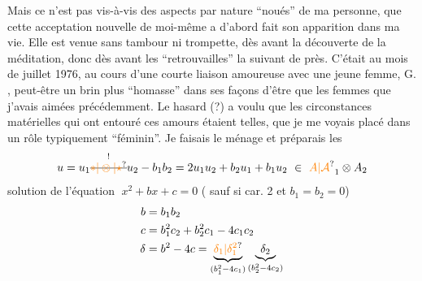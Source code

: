 Mais ce n'est pas vis-à-vis des aspects par nature ``noués'' de ma personne, que cette acceptation nouvelle de moi-même a d'abord fait son apparition dans ma vie. Elle est venue sans tambour ni trompette, dès avant la découverte de la méditation, donc dès avant les ``retrouvailles'' la suivant de près. C'était au mois de juillet 1976, au cours d'une courte liaison amoureuse avec une jeune femme, G. , peut-être un brin plus ``homasse'' dans ses façons d'être que les femmes que j'avais aimées précédemment. Le hasard (?) a voulu que les circonstances matérielles qui ont entouré ces amours étaient telles, que je me voyais placé\margin{\unsure{-}} dans un rôle typiquement ``féminin''. Je faisais le ménage et préparais les
\[
u=u_1\overset{!}{\deleted{\unsure{\ast|\otimes|\star}}}u_2-b_1b_2
=2u_1u_2+b_2u_1+b_1u_2\ \in\ \unsure{A|\mathcal A}_1\otimes A_2
\]
solution de l'équation $\;x^2+bx+c=0$
( sauf si car. 2 et $b_1=b_2=0$)
\[
\begin{aligned}
b&=b_1b_2\\
c&=b_1^2c_2+b_2^2c_1-4c_1c_2\\
\delta&=b^2-4c
=\underbrace{\unsure{\delta_1|\delta_1^2}}_{(b_1^2-4c_1)}
 \underbrace{\delta_2}_{(b_2^2-4c_2)}
\end{aligned}
\]
